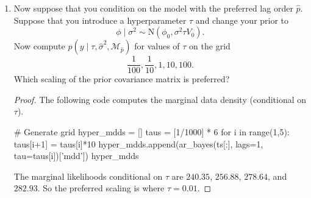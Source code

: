 \documentclass[oneside,reqno]{amsart}
\newcommand{\M}{\mathcal{M}}
\newcommand{\N}{\mathrm N}
\theoremstyle{definition}
\begin{document}
\begin{enumerate}
\begin{proof}
The posterior model probabilities are $0.65$, $0.31$, $0.05$, and $0.002$, for models $\M_1$, $\M_2$, $\M_3$, and $\M_4$, respectively. 
\end{proof}

\item
Now suppose that you condition on the model with the preferred lag
order $\hat p$. Suppose that you introduce a hyperparameter $\tau$ and change your prior to
\begin{equation}
	\phi \mid \sigma^2 \sim \N(\phi_0, \sigma^2\tau V_0).
\end{equation}
Now compute $p(y \mid \tau, \hat \sigma^2, \M_{\hat p})$ for values of $\tau$ on the grid 
\[
	\frac{1}{100}, \frac{1}{10}, 1, 10, 100.
\]
Which scaling of the prior covariance matrix is preferred?

\begin{proof}
The following code computes the marginal data density (conditional on $\tau$).
\begin{python3code}
# Generate grid
hyper_mdds = []
taus = [1/1000] * 6
for i in range(1,5):
    taus[i+1] = taus[i]*10
    hyper_mdds.append(ar_bayes(ts[:], lags=1, tau=taus[i])['mdd'])
hyper_mdds
\end{python3code}

The marginal likelihoods conditional on $\tau$ are $240.35$, $256.88$, $278.64$, and $282.93$. So the preferred scaling is where $\tau=0.01$.
\end{proof}
\end{enumerate}
\end{document}
